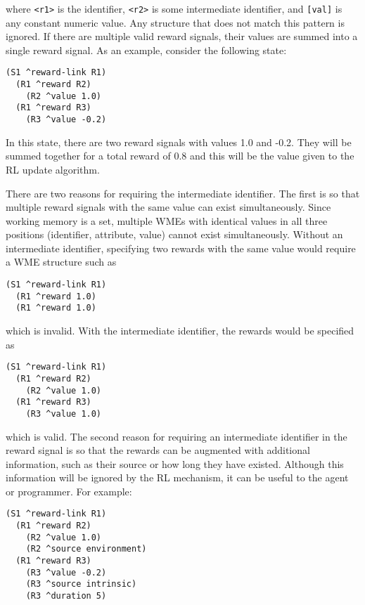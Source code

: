 where \verb=<r1>= is the  identifier, \verb=<r2>= is some intermediate identifier, and \verb=[val]= is any constant numeric value.
Any structure that does not match this pattern is ignored.
If there are multiple valid reward signals, their values are summed into a single reward signal.
As an example, consider the following state:

\begin{verbatim}
(S1 ^reward-link R1)
  (R1 ^reward R2)
    (R2 ^value 1.0)
  (R1 ^reward R3)
    (R3 ^value -0.2)
\end{verbatim}  

In this state, there are two reward signals with values 1.0 and -0.2.
They will be summed together for a total reward of 0.8 and this will be the value given to the RL update algorithm.

There are two reasons for requiring the intermediate identifier.
The first is so that multiple reward signals with the same value can exist simultaneously.
Since working memory is a set, multiple WMEs with identical values in all three positions (identifier, attribute, value) cannot exist simultaneously.
Without an intermediate identifier, specifying two rewards with the same value would require a WME structure such as

\begin{verbatim}
(S1 ^reward-link R1)
  (R1 ^reward 1.0)
  (R1 ^reward 1.0)
\end{verbatim}

which is invalid. With the intermediate identifier, the rewards would be specified as

\begin{verbatim}
(S1 ^reward-link R1)
  (R1 ^reward R2)
    (R2 ^value 1.0)
  (R1 ^reward R3)
    (R3 ^value 1.0)
\end{verbatim}

which is valid.
The second reason for requiring an intermediate identifier in the reward signal is so that the rewards can be augmented with additional information, such as their source or how long they have existed.
Although this information will be ignored by the RL mechanism, it can be useful to the agent or programmer.
For example:

\begin{verbatim}
(S1 ^reward-link R1)
  (R1 ^reward R2)
    (R2 ^value 1.0)
    (R2 ^source environment)
  (R1 ^reward R3)
    (R3 ^value -0.2)
    (R3 ^source intrinsic)
    (R3 ^duration 5)
\end{verbatim}  

